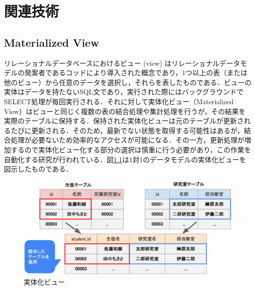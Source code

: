 \documentclass[a4paper,11pt]{ujreport}
\begin{document}
\chapter{関連技術}
\label{chap:LiteratureReview}
\section{Materialized View}
リレーショナルデータベースにおけるビュー (view) はリレーショナルデータモデルの発案者であるコッドにより導入された概念であり\cite{Codd1974RecentII}，1つ以上の表（または他のビュー）から任意のデータを選択し，それらを表したものである．ビューの実体はデータを持たないSQL文であり，実行された際にはバックグラウンドでSELECT処理が毎回実行される．それに対して実体化ビュー（Materialized View）はビューと同じく複数の表の結合処理や集計処理を行うが，その結果を実際のテーブルに保持する．保持された実体化ビューは元のテーブルが更新されるたびに更新される．そのため，最新でない状態を取得する可能性はあるが，結合処理が必要ないため効率的なアクセスが可能になる．その一方，更新処理が増加するので実体化ビュー化する部分の選択は慎重に行う必要があり，この作業を自動化する研究が行われている\cite{mistry2001materialized}．図\ref{figure:MvDescription}は1対1のデータモデルの実体化ビューを図示したものである．
\begin{figure}[htbp]
	\begin{center}
		\includegraphics[width=32em, trim=0 5em 0 0]{src/MvDescription.eps} %
	\end{center}
	\caption{実体化ビュー}
	\label{figure:MvDescription}
\end{figure}
\end{document}

